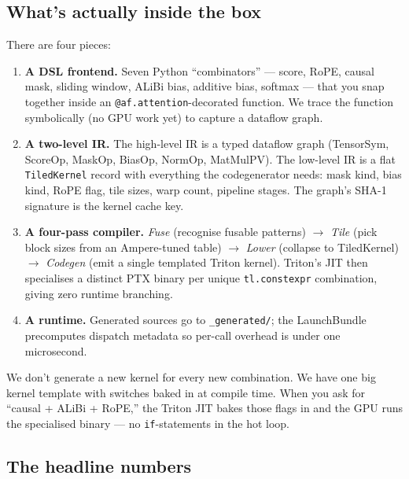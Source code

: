\documentclass[11pt]{article}
\begin{document}
\subsection{What's actually inside the box}

There are four pieces:

\begin{enumerate}[leftmargin=1.4em,itemsep=2pt]
  \item \textbf{A DSL frontend.} Seven Python ``combinators'' --- score, RoPE,
        causal mask, sliding window, ALiBi bias, additive bias, softmax ---
        that you snap together inside an \texttt{@af.attention}-decorated
        function. We trace the function symbolically (no GPU work yet) to
        capture a dataflow graph.
  \item \textbf{A two-level IR.} The high-level IR is a typed dataflow graph
        (TensorSym, ScoreOp, MaskOp, BiasOp, NormOp, MatMulPV). The low-level
        IR is a flat \texttt{TiledKernel} record with everything the
        codegenerator needs: mask kind, bias kind, RoPE flag, tile sizes,
        warp count, pipeline stages. The graph's SHA-1 signature is the
        kernel cache key.
  \item \textbf{A four-pass compiler.}
        \emph{Fuse} (recognise fusable patterns) $\to$
        \emph{Tile} (pick block sizes from an Ampere-tuned table) $\to$
        \emph{Lower} (collapse to TiledKernel) $\to$
        \emph{Codegen} (emit a single templated Triton kernel). Triton's JIT
        then specialises a distinct PTX binary per unique
        \texttt{tl.constexpr} combination, giving zero runtime branching.
  \item \textbf{A runtime.} Generated sources go to \texttt{\_generated/};
        the LaunchBundle precomputes dispatch metadata so per-call overhead is
        under one microsecond.
\end{enumerate}

\begin{layman}
We don't generate a new kernel for every new combination. We have one big
kernel template with switches baked in at compile time. When you ask for
``causal + ALiBi + RoPE,'' the Triton JIT bakes those flags in and the GPU
runs the specialised binary --- no \texttt{if}-statements in the hot loop.
\end{layman}

\subsection{The headline numbers}
\end{document}
